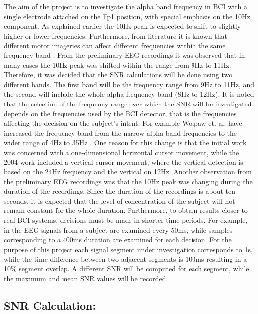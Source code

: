 The aim of the project is to investigate the alpha band frequency in BCI with a single electrode attached on the Fp1 position, with special emphasis on the 10Hz component. As explained earlier the 10Hz peak is expected to shift to slightly higher or lower frequencies. Furthermore, from literature it is known that different motor imageries can affect different frequencies within the same frequency band  \citep{Pfurtscheller2000,Khulman1978}. 
From the preliminary EEG recordings it was observed that in many cases the 10Hz peak was shifted within the range from 9Hz to 11Hz. Therefore, it was decided that the SNR calculations will be done using two different bands. The first band will be the frequency range from 9Hz to 11Hz, and the second will include the whole alpha frequency band (8Hz to 12Hz). It is noted that the selection of the frequency range over which the SNR will be investigated depends on the frequencies used by the BCI detector, that is the frequencies affecting the decision on the subject’s intent. For example Wolpaw et. al. have increased the frequency band from the narrow alpha band frequencies  \citep{Wolpaw1991} to the wider range of 4Hz to 35Hz  \citep{Wolpaw2004}. One reason for this change is that the initial work was concerned with a one-dimensional horizontal cursor movement, while the 2004 work included a vertical cursor movement, where the vertical detection is based on the 24Hz frequency and the vertical on 12Hz.
Another observation from the preliminary EEG recordings was that the 10Hz peak was changing during the duration of the recordings. Since the duration of the recordings is about ten seconds, it is expected that the level of concentration of the subject will not remain constant for the whole duration. Furthermore, to obtain results closer to real BCI systems, decisions must be made in shorter time periods. For example, in  \citep{Wolpaw2004} the EEG signals from a subject are examined every 50ms, while samples corresponding to a 400ms duration are examined for each decision. For the purpose of this project each signal segment under investigation corresponds to 1s, while the time difference between two adjacent segments is 100ms resulting in a 10\% segment overlap. A different SNR will be computed for each segment, while the maximum and mean SNR values will be recorded.

\subsection{\bf{SNR Calculation:}}

